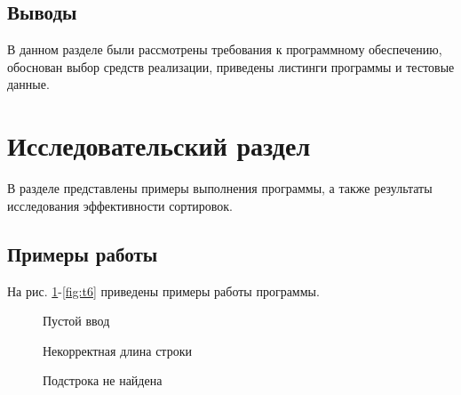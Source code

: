 \documentclass[a4paper,12pt]{article}
\begin{document}
\subsection*{Выводы}

В данном разделе были рассмотрены требования к 
программному обеспечению, обоснован выбор средств 
реализации, приведены листинги программы и тестовые 
данные.

\newpage
\section{Исследовательский раздел}

В разделе представлены примеры выполнения программы,
а также результаты исследования эффективности сортировок.

\subsection{Примеры работы}
        
На рис. \ref{fig:t0}-\ref{fig:t6} приведены примеры работы программы. 
        
\begin{figure}[h!]
\caption{
Пустой ввод}
\label{fig:t0}
\end{figure}

\begin{figure}[h!]
\caption{
Некорректная длина строки}
\label{fig:t1}
\end{figure}

\begin{figure}[h!]
\caption{
Подстрока не найдена}
\label{fig:t2}
\end{figure}
\end{document}

